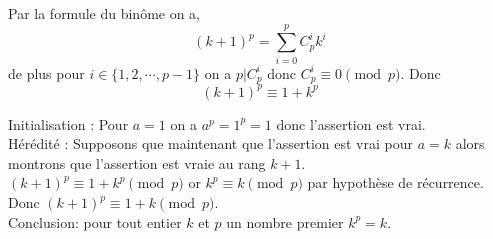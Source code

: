 \documentclass[french]{book}
\begin{document}
\begin{demo}
Par la formule du binôme on a,
$$(k+1)^p=\sum_{i=0}^p C^i_pk^i$$
de plus pour $i \in \{1,2,\cdots,p-1\}$ on a $p\vert C^i_p$ donc $ C^i_p\equiv 0 \pmod p$. 
Donc 
$$(k+1)^p \equiv 1+k^p$$
\end{demo}

\begin{demo}
Initialisation : Pour $a=1$ on a $a^p=1^p=1$ donc l'assertion est vrai. \\

Hérédité : Supposons que maintenant que l'assertion est vrai pour $a=k$ alors montrons que l'assertion est vraie au rang $k+1$.\\

$(k+1)^p \equiv 1+k^p \pmod p$ or $k^p \equiv k \pmod p$ par hypothèse de récurrence. Donc $(k+1)^p \equiv 1+k \pmod p$.\\

Conclusion: pour tout entier $k$ et $p$ un nombre premier $k^p=k$.

\end{demo}
\end{document}
